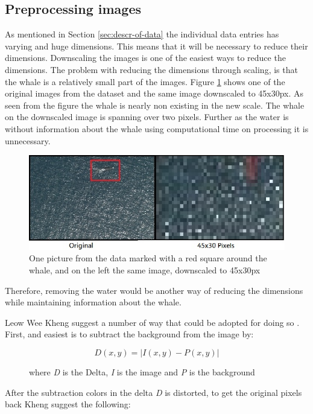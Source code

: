 \subsection{Preprocessing images}
\label{sec:litterature}
As mentioned in Section \ref{sec:descr-of-data} the individual data entries has varying and huge dimensions. 
This means that it will be necessary to reduce their dimensions. 
Downscaling the images is one of the easiest ways to reduce the dimensions.
The problem with reducing the dimensions through scaling, is that the whale is a relatively small part of the images. Figure \ref{fig:scale} shows one of the original images from the dataset and the same image downscaled to 45x30px. As seen from the figure the whale is nearly non existing in the new scale. The whale on the downscaled image is spanning over two pixels.
Further as the water is without information about the whale using computational time on processing it is unnecessary.

\begin{figure}
	\centering
	\includegraphics[width=\linewidth]{Images/scale}
	\caption{One picture from the data marked with a red square around the whale, and on the left the same image, downscaled to 45x30px}
\label{fig:scale}
\end{figure}

Therefore, removing the water would be another way of reducing the dimensions while maintaining information about the whale.

Leow Wee Kheng suggest a number of way that could be adopted for doing so \cite{backgroundRemoval}.
First, and easiest is to subtract the background from the image by:
\begin{figure}[H]
\begin{equation}
D(x,y) = |I(x,y) - P(x,y)|
\end{equation}
\caption{where \emph{D} is the Delta, \emph{I} is the image and \emph{P} is the background}
\end{figure}

After the subtraction colors in the delta \emph{D} is distorted, to get the original pixels back Kheng suggest the following:

